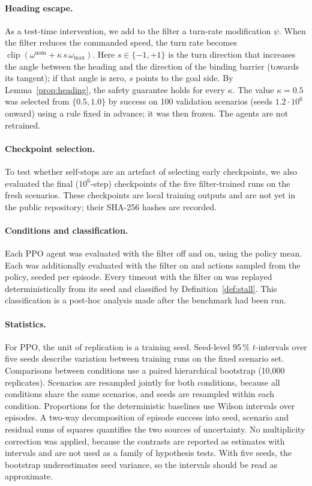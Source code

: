\documentclass[11pt]{article}
\theoremstyle{definition}
\theoremstyle{remark}
\begin{document}
\paragraph{Heading escape.} As a test-time intervention, we add to the filter a turn-rate modification $\psi$. When the filter reduces the commanded speed, the turn rate becomes $\operatorname{clip}(\omega^{\mathrm{nom}}+\kappa\,s\,\omega_{\max})$. Here $s\in\{-1,+1\}$ is the turn direction that increases the angle between the heading and the direction of the binding barrier (towards its tangent); if that angle is zero, $s$ points to the goal side. By Lemma~\ref{prop:heading}, the safety guarantee holds for every $\kappa$. The value $\kappa=0.5$ was selected from $\{0.5, 1.0\}$ by success on 100 validation scenarios (seeds $1.2\cdot10^6$ onward) using a rule fixed in advance; it was then frozen. The agents are not retrained.

\paragraph{Checkpoint selection.} To test whether self-stops are an artefact of selecting early checkpoints, we also evaluated the final ($10^6$-step) checkpoints of the five filter-trained runs on the fresh scenarios. These checkpoints are local training outputs and are not yet in the public repository; their SHA-256 hashes are recorded.

\paragraph{Conditions and classification.} Each PPO agent was evaluated with the filter off and on, using the policy mean. Each was additionally evaluated with the filter on and actions sampled from the policy, seeded per episode. Every timeout with the filter on was replayed deterministically from its seed and classified by Definition~\ref{def:stall}. This classification is a post-hoc analysis made after the benchmark had been run.

\paragraph{Statistics.} For PPO, the unit of replication is a training seed. Seed-level 95\,\% $t$-intervals over five seeds describe variation between training runs on the fixed scenario set. Comparisons between conditions use a paired hierarchical bootstrap (10{,}000 replicates). Scenarios are resampled jointly for both conditions, because all conditions share the same scenarios, and seeds are resampled within each condition. Proportions for the deterministic baselines use Wilson intervals over episodes. A two-way decomposition of episode success into seed, scenario and residual sums of squares quantifies the two sources of uncertainty. No multiplicity correction was applied, because the contrasts are reported as estimates with intervals and are not used as a family of hypothesis tests. With five seeds, the bootstrap underestimates seed variance, so the intervals should be read as approximate.
\end{document}
